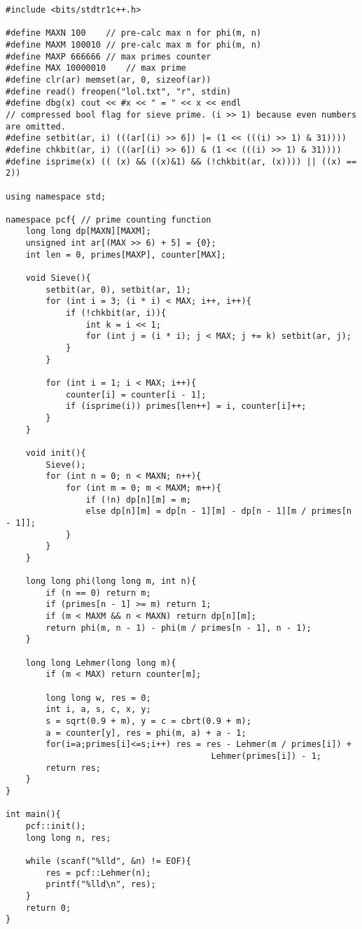 \documentclass[UTF8]{ctexart}
\begin{document}
\begin{framed}
\begin{lstlisting}
#include <bits/stdtr1c++.h>

#define MAXN 100    // pre-calc max n for phi(m, n)
#define MAXM 100010 // pre-calc max m for phi(m, n)
#define MAXP 666666 // max primes counter
#define MAX 10000010    // max prime
#define clr(ar) memset(ar, 0, sizeof(ar))
#define read() freopen("lol.txt", "r", stdin)
#define dbg(x) cout << #x << " = " << x << endl
// compressed bool flag for sieve prime. (i >> 1) because even numbers are omitted. 
#define setbit(ar, i) (((ar[(i) >> 6]) |= (1 << (((i) >> 1) & 31)))) 
#define chkbit(ar, i) (((ar[(i) >> 6]) & (1 << (((i) >> 1) & 31))))
#define isprime(x) (( (x) && ((x)&1) && (!chkbit(ar, (x)))) || ((x) == 2))

using namespace std;

namespace pcf{ // prime counting function
    long long dp[MAXN][MAXM];
    unsigned int ar[(MAX >> 6) + 5] = {0};
    int len = 0, primes[MAXP], counter[MAX];

    void Sieve(){
        setbit(ar, 0), setbit(ar, 1);
        for (int i = 3; (i * i) < MAX; i++, i++){
            if (!chkbit(ar, i)){
                int k = i << 1;
                for (int j = (i * i); j < MAX; j += k) setbit(ar, j);
            }
        }

        for (int i = 1; i < MAX; i++){
            counter[i] = counter[i - 1];
            if (isprime(i)) primes[len++] = i, counter[i]++;
        }
    }

    void init(){
        Sieve();
        for (int n = 0; n < MAXN; n++){
            for (int m = 0; m < MAXM; m++){
                if (!n) dp[n][m] = m;
                else dp[n][m] = dp[n - 1][m] - dp[n - 1][m / primes[n - 1]];
            }
        }
    }

    long long phi(long long m, int n){
        if (n == 0) return m;
        if (primes[n - 1] >= m) return 1;
        if (m < MAXM && n < MAXN) return dp[n][m];
        return phi(m, n - 1) - phi(m / primes[n - 1], n - 1);
    }

    long long Lehmer(long long m){
        if (m < MAX) return counter[m];

        long long w, res = 0;
        int i, a, s, c, x, y;
        s = sqrt(0.9 + m), y = c = cbrt(0.9 + m);
        a = counter[y], res = phi(m, a) + a - 1;
        for(i=a;primes[i]<=s;i++) res = res - Lehmer(m / primes[i]) + 
                                         Lehmer(primes[i]) - 1;
        return res;
    }
}

int main(){
    pcf::init();
    long long n, res;

    while (scanf("%lld", &n) != EOF){
        res = pcf::Lehmer(n);
        printf("%lld\n", res);
    }
    return 0;
}
\end{lstlisting}
\end{framed}
\end{document}
